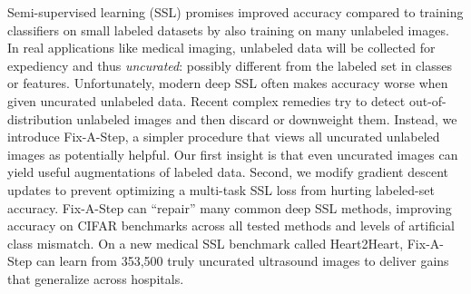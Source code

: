 Semi-supervised learning (SSL) promises improved accuracy compared to training classifiers on small labeled datasets by also training on many unlabeled images.
In real applications like medical imaging, unlabeled data will be collected for expediency and thus \emph{uncurated}: possibly different from the labeled set in classes or features.
Unfortunately, modern deep SSL often makes accuracy worse when given uncurated unlabeled data.
Recent complex remedies try to detect out-of-distribution unlabeled images and then discard or downweight them.
Instead, we introduce Fix-A-Step, a simpler procedure that views all uncurated unlabeled images as potentially helpful.
Our first insight is that even uncurated images can yield useful augmentations of labeled data.
Second, we modify gradient descent updates to prevent optimizing a multi-task SSL loss from hurting labeled-set accuracy.
Fix-A-Step can ``repair'' many common deep SSL methods, improving accuracy on CIFAR benchmarks across all tested methods and levels of artificial class mismatch.
On a new medical SSL benchmark called Heart2Heart, Fix-A-Step can learn from 353,500 truly uncurated ultrasound images to deliver gains that generalize across hospitals.




